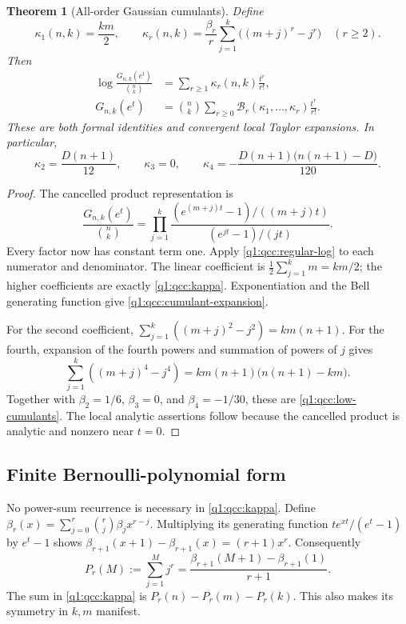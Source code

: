 \documentclass[11pt,a4paper,oneside,openany]{book}
\newtheorem{theorem}{Theorem}[chapter]
\theoremstyle{definition}
\theoremstyle{remark}
\newcommand{\Y}[1]{\mathcal B_{#1}}
\begin{document}
\begin{theorem}[All-order Gaussian cumulants]
\label{q1:qcc:cumulants}
Define
\begin{equation}\label{q1:qcc:kappa}
 \kappa_1(n,k)=\frac{km}{2},\qquad
 \kappa_r(n,k)=\frac{\beta_r}{r}
       \sum_{j=1}^{k}\bigl((m+j)^r-j^r\bigr)\quad(r\ge2).
\end{equation}
Then
\begin{align}
 \log\frac{G_{n,k}(e^t)}{\binom nk}
   &=\sum_{r\ge1}\kappa_r(n,k)\frac{t^r}{r!},
       \label{q1:qcc:log-cumulants}\\
 G_{n,k}(e^t)
   &=\binom nk\sum_{r\ge0}
      \Y r(\kappa_1,\ldots,\kappa_r)\frac{t^r}{r!}.
       \label{q1:qcc:cumulant-expansion}
\end{align}
These are both formal identities and convergent local Taylor expansions.
In particular,
\begin{equation}\label{q1:qcc:low-cumulants}
 \kappa_2=\frac{D(n+1)}{12},\qquad
 \kappa_3=0,\qquad
 \kappa_4=-\frac{D(n+1)\bigl(n(n+1)-D\bigr)}{120}.
\end{equation}
\end{theorem}
\begin{proof}
The cancelled product representation is
\[
 \frac{G_{n,k}(e^t)}{\binom nk}
 =\prod_{j=1}^{k}
 \frac{(e^{(m+j)t}-1)/((m+j)t)}{(e^{jt}-1)/(jt)}.
\]
Every factor now has constant term one. Apply
\cref{q1:qcc:regular-log} to each numerator and denominator. The linear
coefficient is \(\frac12\sum_{j=1}^k m=km/2\); the higher coefficients
are exactly \eqref{q1:qcc:kappa}. Exponentiation and the Bell generating
function give \eqref{q1:qcc:cumulant-expansion}.

For the second coefficient,
\(\sum_{j=1}^k((m+j)^2-j^2)=km(n+1)\). For the fourth,
expansion of the fourth powers and summation of powers of \(j\) gives
\[
 \sum_{j=1}^k((m+j)^4-j^4)
 =km(n+1)\bigl(n(n+1)-km\bigr).
\]
Together with \(\beta_2=1/6\), \(\beta_3=0\), and \(\beta_4=-1/30\),
these are \eqref{q1:qcc:low-cumulants}. The local analytic assertions follow
because the cancelled product is analytic and nonzero near \(t=0\).
\end{proof}

\subsection{Finite Bernoulli-polynomial form}
No power-sum recurrence is necessary in \eqref{q1:qcc:kappa}. Define
\(\beta_r(x)=\sum_{j=0}^r\binom rj\beta_jx^{r-j}\). Multiplying its
generating function \(te^{xt}/(e^t-1)\) by \(e^t-1\) shows
\(\beta_{r+1}(x+1)-\beta_{r+1}(x)=(r+1)x^r\). Consequently
\[
 P_r(M):=\sum_{j=1}^{M}j^r
   =\frac{\beta_{r+1}(M+1)-\beta_{r+1}(1)}{r+1}.
\]
The sum in \eqref{q1:qcc:kappa} is \(P_r(n)-P_r(m)-P_r(k)\).
This also makes its symmetry in \(k,m\) manifest.
\end{document}
